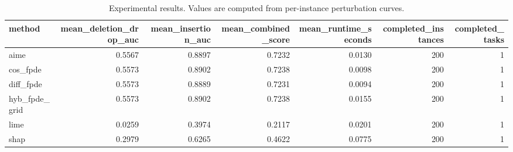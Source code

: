 \begin{table}[t]
\caption{Experimental results. Values are computed from per-instance perturbation curves.}
\label{tab:main_results_computed}
\centering
\begin{tabular}{lrrrrrr}
\toprule
method & mean\_deletion\_drop\_auc & mean\_insertion\_auc & mean\_combined\_score & mean\_runtime\_seconds & completed\_instances & completed\_tasks \\
\midrule
aime & 0.5567 & 0.8897 & 0.7232 & 0.0130 & 200 & 1 \\
cos\_fpde & 0.5573 & 0.8902 & 0.7238 & 0.0098 & 200 & 1 \\
diff\_fpde & 0.5573 & 0.8889 & 0.7231 & 0.0094 & 200 & 1 \\
hyb\_fpde\_grid & 0.5573 & 0.8902 & 0.7238 & 0.0155 & 200 & 1 \\
lime & 0.0259 & 0.3974 & 0.2117 & 0.0201 & 200 & 1 \\
shap & 0.2979 & 0.6265 & 0.4622 & 0.0775 & 200 & 1 \\
\bottomrule
\end{tabular}

\end{table}
